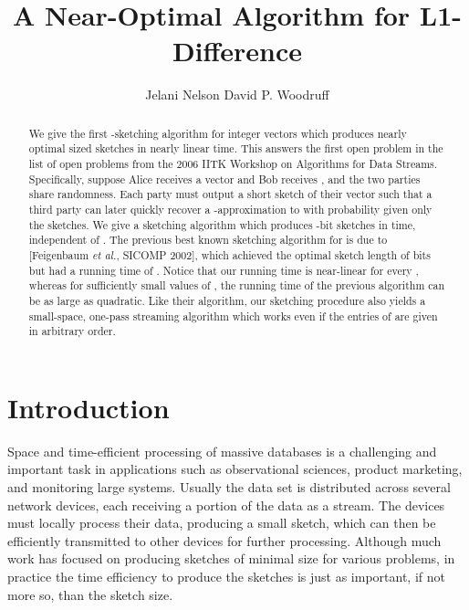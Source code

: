 \documentclass[letterpaper,11pt]{article}
\newcommand{\oct}{\quad\quad}                                   \renewcommand{\And}{\text{\normalfont\,~and~\,}}
\newcommand{\SectionName}[1]{\label{sec:#1}}
\begin{document}
\author{Jelani Nelson\footnotemark[2]\oct
  David P. Woodruff\footnotemark[3]}

\date{}


\title{A Near-Optimal Algorithm for L1-Difference}

\maketitle

\begin{abstract}
\thispagestyle{empty}
\noindent

We give the first -sketching algorithm for integer vectors which
produces nearly optimal sized sketches in nearly linear time. This
answers the first open problem in the list of open problems 
from the 2006 IITK Workshop on Algorithms for Data Streams. 
Specifically, suppose Alice
receives a vector  and Bob receives
,
and the two parties share randomness.  Each party must output a short 
sketch of their vector such that a
third party can later quickly recover a -approximation to
 with  probability given only the sketches.
We give a sketching algorithm which produces
-bit sketches in 
time, independent of . The
previous best known sketching algorithm for  is due to
[Feigenbaum {\it et al.}, SICOMP 2002], which achieved the optimal
sketch length of
 bits but had a running time of
. Notice that our
running time is near-linear for every , whereas for sufficiently
small values of , the running time of the previous algorithm can
be as large as
quadratic. Like their algorithm, our sketching
procedure also yields a small-space, one-pass streaming algorithm
which works even if the
entries of  are given in arbitrary order. 
\end{abstract}

\section{Introduction}\SectionName{intro}
Space and time-efficient processing of massive databases is a
challenging and important task in applications such as observational
sciences, product marketing, and monitoring large systems. Usually the
data set is distributed across several network devices, each receiving
a portion of the data as a stream. The devices must locally
process their data, producing a small sketch, which can then be
efficiently transmitted to other devices for further
processing. Although much work has focused on producing sketches of
minimal size for various problems, in practice the time efficiency to
produce the sketches is just as important, if not more so, than the
sketch size. 
\end{document}
